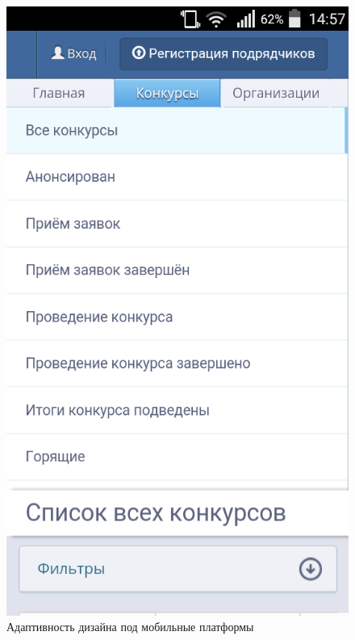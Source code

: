 \begin{figure}[h!]
	\begin{center}
		\begin{minipage}[h]{\linewidth}
			\centering
			\includegraphics[width=0.35\linewidth]{images/test-smartphone.png}
			\caption{Адаптивность дизайна под мобильные платформы}
			\label{img:test-smartphone}
		\end{minipage}
		\hfill
	\end{center}
\end{figure}

\clearpage
\newpage